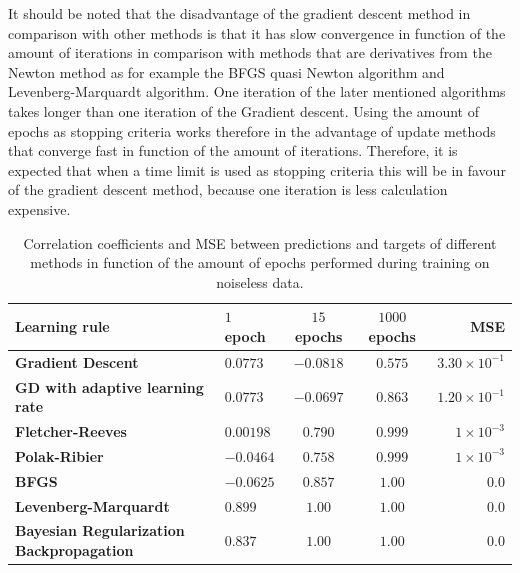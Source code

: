 \documentclass[a4paper,10pt]{article}
\begin{document}
It should be noted that the disadvantage of the gradient descent method in comparison with other methods is that it has slow convergence in function of the amount of iterations in comparison with methods that are derivatives from the Newton method as for example the BFGS quasi Newton algorithm and Levenberg-Marquardt algorithm. One iteration of the later mentioned algorithms takes longer than one iteration of the Gradient descent. Using the amount of epochs as stopping criteria works therefore in the advantage of update methods that converge fast in function of the amount of iterations. Therefore, it is expected that when a time limit is used as stopping criteria this will be in favour of the gradient descent method, because one iteration is less calculation expensive. \\

\begin{table}
	\centering
	\begin{tabular}{@{}l|lccr@{}} \toprule
		\textbf{Learning rule}    & $ 1 $ epoch & $ 15 $ epochs & $ 1000 $ epochs & MSE \\\midrule
		\textbf{Gradient Descent}    & $ 0.0773 $  & $ -0.0818 $  & $ 0.575 $ & $ 3.30\times10^{-1} $ \\
		\textbf{GD with adaptive learning rate} & $ 0.0773 $  & $ -0.0697 $  & $ 0.863 $ & $ 1.20\times10^{-1} $  \\
		\textbf{Fletcher-Reeves} & $ 0.00198 $  & $ 0.790 $  & $ 0.999 $ & $ 1\times10^{-3} $ \\
		\textbf{Polak-Ribier} & $ -0.0464 $  & $ 0.758 $  & $ 0.999 $ & $ 1\times10^{-3} $  \\
		\textbf{BFGS} & $ -0.0625 $  & $ 0.857 $  & $ 1.00 $ & $ 0.0 $ \\
		\textbf{Levenberg-Marquardt} & $ 0.899 $  & $ 1.00 $  & $ 1.00 $ & $ 0.0 $ \\
		\textbf{Bayesian Regularization Backpropagation} & $ 0.837 $  & $ 1.00 $  & $ 1.00 $ & $ 0.0 $ \\ \bottomrule
	\end{tabular}
	\caption{Correlation coefficients and MSE between predictions and targets of  different methods in function of the amount of epochs performed during training on noiseless data.}
	\label{tab:corr_no_noise}
\end{table}

\end{document}
